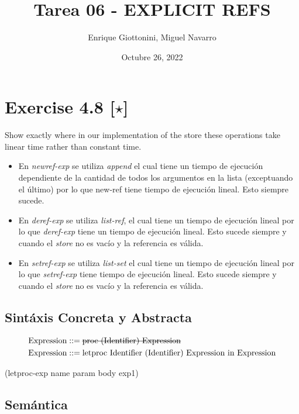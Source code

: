 \documentclass[11pt]{article}
\title{ Tarea 06 - EXPLICIT REFS}
\author{ Enrique Giottonini, Miguel Navarro}
\date{Octubre 26, 2022}
\begin{document}
\maketitle	

\section*{Exercise 4.8 [$\star$]}
Show exactly where in our implementation of the store these operations take linear time rather than constant time.\\
\begin{itemize}


\item En \textit{newref-exp} se utiliza \textit{append} el cual tiene un tiempo de ejecución dependiente de la cantidad de todos los argumentos en la lista (exceptuando el último) por lo que new-ref tiene tiempo de ejecución lineal. Esto siempre sucede.\\
\item En \textit{deref-exp} se utiliza \textit{list-ref}, el cual tiene un tiempo de ejecución lineal por lo que \textit{deref-exp} tiene un tiempo de ejecución lineal. Esto sucede siempre y cuando el \textit{store} no es vacío y la referencia es válida.\\
\item En \textit{setref-exp} se utiliza \textit{list-set} el cual tiene un tiempo de ejecución lineal por lo que \textit{setref-exp} tiene tiempo de ejecución lineal. Esto sucede siempre y cuando el \textit{store} no es vacío y la referencia es válida. \\
\end{itemize}
\subsection*{Sintáxis Concreta y Abstracta}
\begin{align*}
\text{Expression} &::=  \text{\sout{proc (Identifier) Expression}} \\
\text{Expression}	&::= \text{letproc Identifier (Identifier) Expression in Expression}
\end{align*}

\begin{center}
(letproc-exp name param body exp1)
\end{center}

\subsection*{Semántica}
\end{document}

